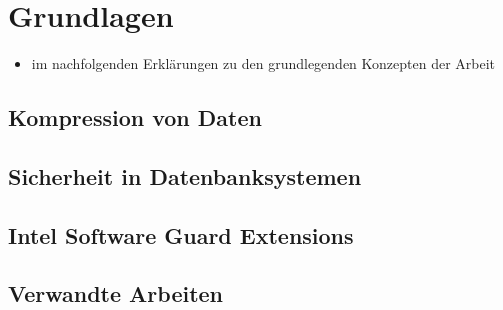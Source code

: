 
\chapter{Grundlagen}
\begin{itemize}
	\item im nachfolgenden Erklärungen zu den grundlegenden Konzepten der Arbeit
\end{itemize}
\section{Kompression von Daten}

\section{Sicherheit in Datenbanksystemen}

\section{Intel Software Guard Extensions}

\section{Verwandte Arbeiten}